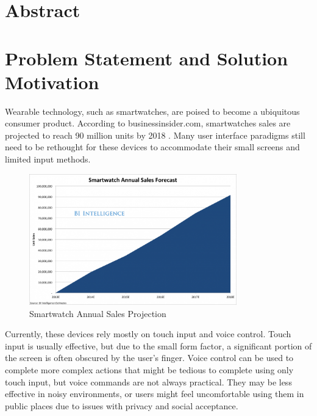 \documentclass{article}
\begin{document}

\section{Abstract}


\section{Problem Statement and Solution Motivation}
Wearable technology, such as smartwatches, are poised to become a ubiquitous consumer product. According to businessinsider.com, smartwatches sales are projected to reach 90 million units by 2018 \cite{BusinessInsider}. Many user interface paradigms still need to be rethought for these devices to accommodate their small screens and limited input methods. 

\begin{figure}[ht!]
  \centering
  \includegraphics[width=90mm]{smartwatch.png}
  \caption{Smartwatch Annual Sales Projection \label{overflow}}
\end{figure}

Currently, these devices rely mostly on touch input and voice control. Touch input is usually effective, but due to the small form factor, a significant portion of the screen is often obscured by the user's finger. Voice control can be used to complete more complex actions that might be tedious to complete using only touch input, but voice commands are not always practical. They may be less effective in noisy environments, or users might feel uncomfortable using them in public places due to issues with privacy and social acceptance.
\end{document}
